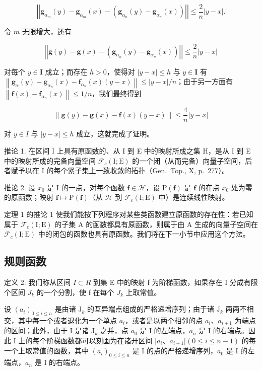 \[
\left| \left| \mathbf {g} _ {\alpha_ {m}} (y) - \mathbf {g} _ {\alpha_ {m}} (x) - \left(\mathbf {g} _ {\alpha_ {n}} (y) - \mathbf {g} _ {\alpha_ {n}} (x)\right) \right| \right| \leqslant \frac {2}{n} | y - x |.
\]

令 \(m\) 无限增大，还有

\[
\left| \left| \mathbf {g} (y) - \mathbf {g} (x) - \left(\mathbf {g} _ {\alpha_ {n}} (y) - \mathbf {g} _ {\alpha_ {n}} (x)\right) \right| \right| \leqslant \frac {2}{n} | y - x |
\]

对每个 \(y \in \mathbf{I}\) 成立；而存在 \(h > 0\)，使得对 \(|y - x| \leqslant h\) 与 \(y \in \mathbf{I}\) 有 \(\left\| \mathbf{g}_{\alpha}(y) - \mathbf{g}_{\alpha_n}(x) - \mathbf{f}_{\alpha_n}(x)(y - x) \right\| \leqslant |y - x| / n\)；由于另一方面有 \(\left\| \mathbf{f}(x) - \mathbf{f}_{\alpha_n}(x) \right\| \leqslant 1 / n\)，我们最终得到

\[
\| \mathbf {g} (y) - \mathbf {g} (x) - \mathbf {f} (x) (y - x) \| \leqslant \frac {4}{n} | y - x |
\]

对 \(y \in I\) 与 \(|y - x| \leqslant h\) 成立，这就完成了证明。

推论 1. 在区间 I 上具有原函数的、从 I 到 E 中的映射所成之集 H，是从 I 到 E 中的映射所成的完备向量空间 \(\mathcal{F}_{c}(\mathrm{I};\mathrm{E})\) 的一个闭（从而完备）向量子空间，后者赋予以在 I 的每个紧子集上一致收敛的拓扑（Gen.~Top., X, p.~277）。

推论 2. 设 \(x_0\) 是 I 的一点，对每个函数 \(\mathbf{f} \in \mathcal{H}\)，设 \(\mathrm{P}(\mathbf{f})\) 是 \(\mathbf{f}\) 的在点 \(x_0\) 处为零的原函数；映射 \(\mathbf{f} \mapsto \mathrm{P}(\mathbf{f})\)（从 \(\mathcal{H}\) 到 \(\mathcal{F}_c(\mathrm{I};\mathrm{E})\) 中）是连续线性映射。

定理 1 的推论 1 使我们能按下列程序对某些类函数建立原函数的存在性：若已知属于 \(\mathcal{F}_{c}(\mathrm{I};\mathrm{E})\) 的子集 A 的函数都具有原函数，则属于由 A 生成的向量子空间在 \(\mathcal{F}_{c}(\mathrm{I};\mathrm{E})\) 中的闭包的函数也具有原函数。我们将在下一小节中应用这个方法。

\subsection{规则函数}

定义 2. 我们称从区间 \(I \subset R\) 到集 E 中的映射 f 为阶梯函数，如果存在 I 分成有限个区间 \(J_{k}\) 的一个分割，使 f 在每个 \(J_{k}\) 上取常值。

设 \((a_{i})_{0\leqslant i\leqslant n}\) 是由诸 \(\mathrm{J}_k\) 的互异端点组成的严格递增序列；由于诸 \(\mathrm{J}_k\) 两两不相交，其中每一个或者退化为一个单点 \(a_{i}\)，或者是以两个相邻的点 \(a_{i}\)、\(a_{i + 1}\) 为端点的区间；此外，由于 I 是诸 \(\mathrm{J}_k\) 之并，点 \(a_0\) 是 I 的左端点，\(a_{n}\) 是 I 的右端点。因此 I 上的每个阶梯函数都可以刻画为在诸开区间 \(]a_{i}\)、\(a_{i+1}[ (0 \leqslant i \leqslant n-1)\) 的每一个上取常值的函数，其中 \((a_{i})_{0 \leqslant i \leqslant n}\) 是 I 的点的严格递增序列，\(a_{0}\) 是 I 的左端点，\(a_{n}\) 是 I 的右端点。

